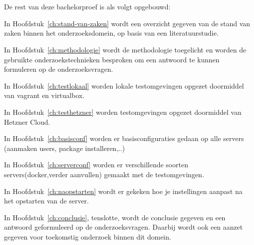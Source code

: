 \section{}
\label{sec:opzet-bachelorproef}


De rest van deze bachelorproef is als volgt opgebouwd:

In Hoofdstuk~\ref{ch:stand-van-zaken} wordt een overzicht gegeven van de stand van zaken binnen het onderzoeksdomein, op basis van een literatuurstudie.

In Hoofdstuk~\ref{ch:methodologie} wordt de methodologie toegelicht en worden de gebruikte onderzoekstechnieken besproken om een antwoord te kunnen formuleren op de onderzoeksvragen.

In Hoofdstuk~\ref{ch:testlokaal} worden lokale testomgevingen  opgezet doormiddel van vagrant en virtualbox.


In Hoofdstuk~\ref{ch:testhetzner} worden testomgevingen opgezet doormiddel van Hetzner Cloud.

In Hoofdstuk~\ref{ch:basisconf} worden er basisconfiguraties gedaan op alle servers (aanmaken users, package installeren,..)

In Hoofdstuk~\ref{ch:serverconf} worden er verschillende soorten servers(docker,verder aanvullen) gemaakt met de testomgevingen.

In Hoofdstuk~\ref{ch:naopstarten} wordt er gekeken hoe je instellingen aanpast na het opstarten van de server.


In Hoofdstuk~\ref{ch:conclusie}, tenslotte, wordt de conclusie gegeven en een antwoord geformuleerd op de onderzoeksvragen. Daarbij wordt ook een aanzet gegeven voor toekomstig onderzoek binnen dit domein.